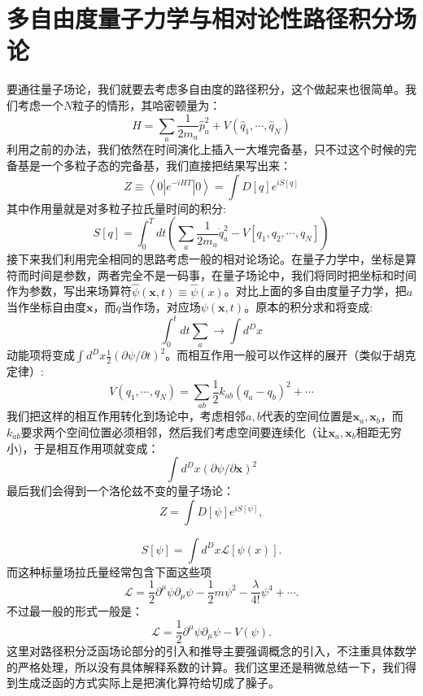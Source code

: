 \documentclass[12pt, a4paper, oneside]{ctexart}
\begin{document}
\section{多自由度量子力学与相对论性路径积分场论}
要通往量子场论，我们就要去考虑多自由度的路径积分，这个做起来也很简单。我们考虑一个$N$粒子的情形，其哈密顿量为：
\begin{equation}
    H=\sum_a\frac{1}{2m_a}\hat p_a^2+V(\hat q_1,\cdots,\hat q_N)
\end{equation}
利用之前的办法，我们依然在时间演化上插入一大堆完备基，只不过这个时候的完备基是一个多粒子态的完备基，我们直接把结果写出来：
\begin{equation}
    Z\equiv\left< 0 |e^{-iHT}| 0 \right>=\int D[q]e^{iS[q]}
\end{equation}
其中作用量就是对多粒子拉氏量时间的积分:
\begin{equation}
    S[q]=\int_0^T d t (\sum_a\frac{1}{2m_a}\dot q_a^2-V[q_1,q_2,\cdots,q_N])
\end{equation}
接下来我们利用完全相同的思路考虑一般的相对论场论。在量子力学中，坐标是算符而时间是参数，两者完全不是一码事，在量子场论中，我们将同时把坐标和时间作为参数，写出来场算符$\hat\psi(\bm x,t)\equiv \hat\psi(x)$。对比上面的多自由度量子力学，把$a$当作坐标自由度$\mathbf x$，而$q$当作场，对应场$\psi(\bm x,t)$。原本的积分求和将变成:
\begin{equation}
    \int_0^t d t\sum_a\rightarrow \int d^Dx
\end{equation} 
动能项将变成$\int d^D x \frac{1}{2}(\partial\psi/\partial t)^2$。而相互作用一般可以作这样的展开（类似于胡克定律）:
\begin{equation}
    V(q_1,\cdots,q_N)=\sum_{ab}\frac{1}{2}k_{ab}(q_a-q_b)^2+\cdots
\end{equation}
我们把这样的相互作用转化到场论中，考虑相邻$a,b$代表的空间位置是$\mathbf x_a,\mathbf x_b$，而$k_{ab}$要求两个空间位置必须相邻，然后我们考虑空间要连续化（让$\mathbf x_a,\mathbf x_b$相距无穷小)，于是相互作用项就变成：
\begin{equation}
    \int d^Dx(\partial\psi/\partial \bm x)^2
\end{equation}
最后我们会得到一个洛伦兹不变的量子场论：
\begin{equation}
    Z=\int D[\psi]e^{iS[\psi]},
\end{equation}

\begin{equation}
    S[\psi]=\int d^Dx\mathcal L[\psi(x)].
\end{equation}
而这种标量场拉氏量经常包含下面这些项
\begin{equation}
    \mathcal L=\frac{1}{2}\partial^\mu\psi\partial_\mu\psi-\frac{1}{2}m\psi^2-\frac{\lambda}{4!}\psi^4+\cdots.
\end{equation}
不过最一般的形式一般是：
\begin{equation}
    \mathcal L=\frac{1}{2}\partial^\mu\psi\partial_\mu\psi-V(\psi).
\end{equation}
这里对路径积分泛函场论部分的引入和推导主要强调概念的引入，不注重具体数学的严格处理，所以没有具体解释系数的计算。我们这里还是稍微总结一下，我们得到生成泛函的方式实际上是把演化算符给切成了臊子。
\end{document}
